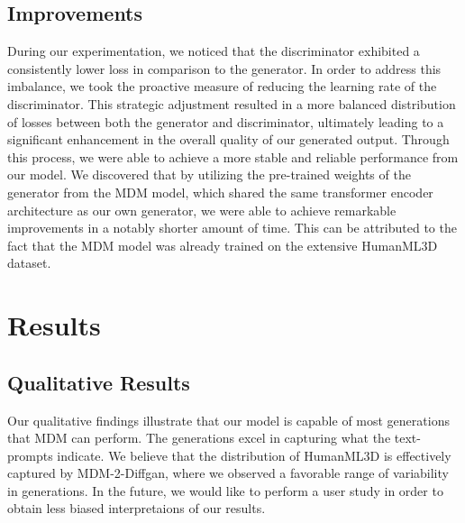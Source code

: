 \documentclass[10pt,twocolumn,letterpaper]{article}
\begin{document}
\subsection{Improvements}
During our experimentation, we noticed that the discriminator exhibited a consistently lower loss in comparison to the generator. In order to address this imbalance, we took the proactive measure of reducing the learning rate of the discriminator. This strategic adjustment resulted in a more balanced distribution of losses between both the generator and discriminator, ultimately leading to a significant enhancement in the overall quality of our generated output. Through this process, we were able to achieve a more stable and reliable performance from our model.
We discovered that by utilizing the pre-trained weights of the generator from the MDM model, which shared the same transformer encoder architecture as our own generator, we were able to achieve remarkable improvements in a notably shorter amount of time. This can be attributed to the fact that the MDM model was already trained on the extensive HumanML3D dataset.

\section{Results}
\label{sec:results}
\subsection{Qualitative Results}

Our qualitative findings illustrate that our model is capable of most generations that MDM can perform. The generations excel in capturing what the text-prompts 
indicate. We believe that the distribution of HumanML3D is effectively captured by MDM-2-Diffgan, where we observed a favorable range of variability in generations. 
In the future, we would like to perform a user study in order to obtain less biased interpretaions of our results. 
\end{document}
